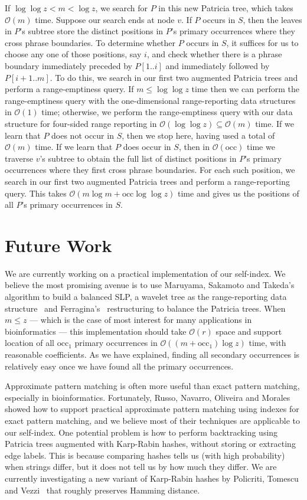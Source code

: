 \documentclass[review]{elsarticle}
\newcommand{\Oh}[1]
    {\ensuremath{\mathcal{O}\!\left( {#1} \right)}}
\newcommand{\occ}
    {\ensuremath{\mathrm{occ}}}
\begin{document}
If \(\log \log z < m < \log z\), we search for $P$ in this new Patricia tree, which takes $\Oh{m}$ time.  Suppose our search ends at node $v$.  If $P$ occurs in $S$, then the leaves in $P$'s subtree store the distinct positions in $P$'s primary occurrences where they cross phrase boundaries.  To determine whether $P$ occurs in $S$, it suffices for us to choose any one of those positions, say $i$, and check whether there is a phrase boundary immediately preceded by \(P [1..i]\) and immediately followed by \(P [i + 1..m]\).  To do this, we search in our first two augmented Patricia trees and perform a range-emptiness query.  If \(m \leq \log \log z\) time then we can perform the range-emptiness query with the one-dimensional range-reporting data structures in $\Oh{1}$ time; otherwise, we perform the range-emptiness query with our data structure for four-sided range reporting in \(\Oh{\log \log z} \subseteq \Oh{m}\) time.  If we learn that $P$ does not occur in $S$, then we stop here, having used a total of $\Oh{m}$ time.  If we learn that $P$ does occur in $S$, then in $\Oh{\occ}$ time we traverse $v$'s subtree to obtain the full list of distinct positions in $P$'s primary occurrences where they first cross phrase boundaries.  For each such position, we search in our first two augmented Patricia trees and perform a range-reporting query.  This takes $\Oh{m \log m + \occ \log \log z}$ time and gives us the positions of all $P$'s primary occurrences in $S$.

\section{Future Work} \label{sec:future}

We are currently working on a practical implementation of our self-index.  We believe the most promising avenue is to use Maruyama, Sakamoto and Takeda's~\cite{MST12} algorithm to build a balanced SLP, a wavelet tree as the range-reporting data structure~\cite{GGV03,Nav12} and Ferragina's~\cite{Fer11} restructuring to balance the Patricia trees.  When \(m \leq z\) --- which is the case of most interest for many applications in bioinformatics --- this implementation should take $\Oh{r}$ space and support location of all $\occ_1$ primary occurrences in $\Oh{(m + \occ_1) \log z}$ time, with reasonable coefficients.  As we have explained, finding all secondary occurrences is relatively easy once we have found all the primary occurrences.

Approximate pattern matching is often more useful than exact pattern matching, especially in bioinformatics.  Fortunately, Russo, Navarro, Oliveira and Morales~\cite{RNOM09} showed how to support practical approximate pattern matching using indexes for exact pattern matching, and we believe most of their techniques are applicable to our self-index.  One potential problem is how to perform backtracking using Patricia trees augmented with Karp-Rabin hashes, without storing or extracting edge labels.  This is because comparing hashes tells us (with high probability) when strings differ, but it does not tell us by how much they differ.  We are currently investigating a new variant of Karp-Rabin hashes by Policriti, Tomescu and Vezzi~\cite{PTV??} that roughly preserves Hamming distance.
\end{document}

